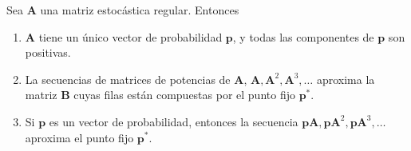 \begin{teo}
Sea $\mathbf{A}$ una matriz estocástica regular. Entonces

\begin{enumerate}
\item $\mathbf{A}$ tiene un único vector de probabilidad $\mathbf{p}$, y todas las componentes de $\mathbf{p}$ son positivas.
\item La secuencias de matrices de potencias de $\mathbf{A}$, $\mathbf{A},\mathbf{A}^2,\mathbf{A}^3,\dots$ aproxima la matriz $\mathbf{B}$ cuyas filas están compuestas por el punto fijo $\mathbf{p}^*$.
\item Si $\mathbf{p}$ es un vector de probabilidad, entonces la secuencia $\mathbf{p A}, \mathbf{p} \mathbf{A}^2,\mathbf{p} \mathbf{A}^3,\dots$ aproxima el punto fijo $\mathbf{p}^*$.
\end{enumerate}
\end{teo}

